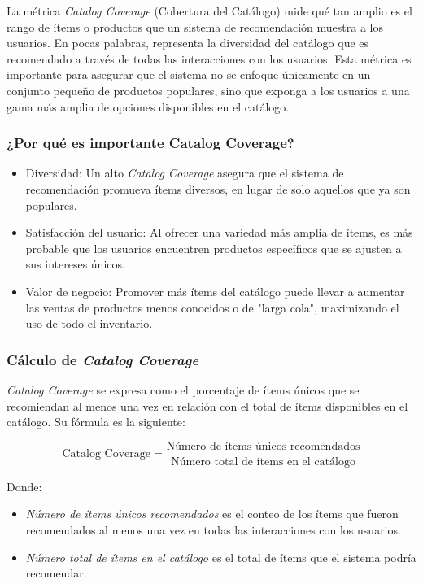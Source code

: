 \documentclass[11pt,a4paper,twoside]{thesis}
\begin{document}
La métrica \textit{Catalog Coverage} (Cobertura del Catálogo) mide qué tan amplio es el rango de ítems o productos que un sistema de recomendación muestra a los usuarios. En pocas palabras, representa la diversidad del catálogo que es recomendado a través de todas las interacciones con los usuarios. Esta métrica es importante para asegurar que el sistema no se enfoque únicamente en un conjunto pequeño de productos populares, sino que exponga a los usuarios a una gama más amplia de opciones disponibles en el catálogo.

\subsubsection{¿Por qué es importante Catalog Coverage?}
\begin{itemize}
	\item Diversidad: Un alto \textit{Catalog Coverage} asegura que el sistema de recomendación promueva ítems diversos, en lugar de solo aquellos que ya son populares.
	\item Satisfacción del usuario: Al ofrecer una variedad más amplia de ítems, es más probable que los usuarios encuentren productos específicos que se ajusten a sus intereses únicos.
	\item Valor de negocio: Promover más ítems del catálogo puede llevar a aumentar las ventas de productos menos conocidos o de "larga cola", maximizando el uso de todo el inventario.
\end{itemize}



\subsubsection{Cálculo de \textit{Catalog Coverage}}

\textit{Catalog Coverage} se expresa como el porcentaje de ítems únicos que se recomiendan al menos una vez en relación con el total de ítems disponibles en el catálogo. Su fórmula es la siguiente:

\[
	\text{Catalog Coverage} = \frac{\text{Número de ítems únicos recomendados}}{\text{Número total de ítems en el catálogo}}
\]

Donde:
\begin{itemize}
	\item \textit{Número de ítems únicos recomendados} es el conteo de los ítems que fueron recomendados al menos una vez en todas las interacciones con los usuarios.
	\item \textit{Número total de ítems en el catálogo} es el total de ítems que el sistema podría recomendar.
\end{itemize}
\end{document}
